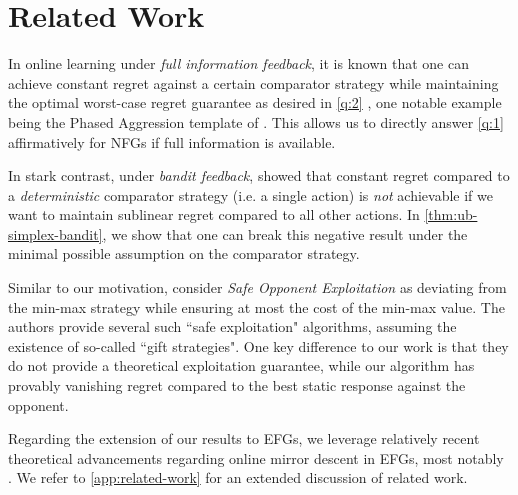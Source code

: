 \section{Related Work}
\label{sec:related-work}

In online learning under \emph{full information feedback}, it is known that one can achieve constant regret against a certain comparator strategy while maintaining the optimal worst-case regret guarantee as desired in \cref{q:2} \citep{hutter2005adaptive,even2008regret,kapralov2011prediction,koolen2013pareto,sani2014exploiting,orabona2016coin,cutkosky2018black,orabona2019modern}, one notable example being the Phased Aggression template of \citet{even2008regret}. This allows us to directly answer \cref{q:1} affirmatively for NFGs if full information is available.

In stark contrast, under \textit{bandit feedback}, \citet{lattimore2015pareto} showed that constant regret compared to a \emph{deterministic} comparator strategy (i.e. a single action) is \emph{not} achievable if we want to maintain sublinear regret compared to all other actions. In \cref{thm:ub-simplex-bandit}, we show that one can break this negative result under the minimal possible assumption on the comparator strategy.

Similar to our motivation, \citet{ganzfried2015safe} consider \emph{Safe Opponent Exploitation} as deviating from the min-max strategy while ensuring at most the cost of the min-max value. The authors provide several such ``safe exploitation" algorithms, assuming the existence of so-called ``gift strategies". One key difference to our work is that they do not provide a theoretical exploitation guarantee, while our algorithm has provably vanishing regret compared to the best static response against the opponent. 

Regarding the extension of our results to EFGs, we leverage relatively recent theoretical advancements regarding online mirror descent in EFGs, most notably \citet{kozuno2021model,bai2022near}. We refer to \cref{app:related-work} for an extended discussion of related work.